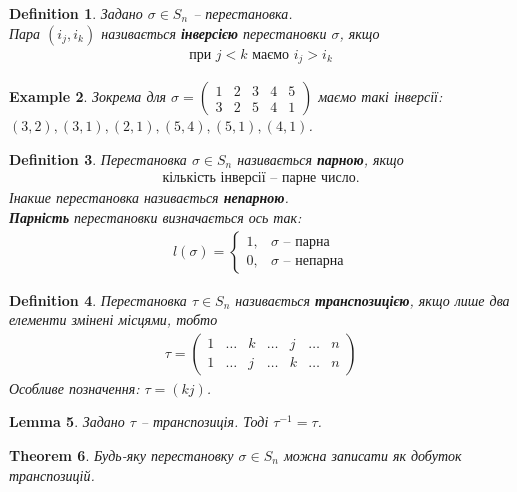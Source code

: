 \documentclass[a4paper, 10pt]{article}
\theoremstyle{theoremdd}
\newtheorem{theorem}{Theorem}[subsection]
\theoremstyle{theoremdd}
\newtheorem{definition}[theorem]{Definition}
\theoremstyle{theoremdd}
\theoremstyle{theoremdd}
\theoremstyle{theoremdd}
\newtheorem{example}[theorem]{Example}
\theoremstyle{theoremdd}
\theoremstyle{theoremdd}
\theoremstyle{theoremdd}
\theoremstyle{theoremdd}
\theoremstyle{theoremdd}
\theoremstyle{theoremdd}
\theoremstyle{theoremdd}
\theoremstyle{theoremdd}
\newtheorem{lemma}[theorem]{Lemma}
\theoremstyle{theoremdd}
\theoremstyle{theoremdd}
\begin{document}
\begin{definition}
Задано $\sigma \in S_n$ -- перестановка.\\
Пара $(i_j,i_k)$ називається \textbf{інверсією} перестановки $\sigma$, якщо 
\begin{align*}
\text{при } j < k \text{ маємо  } i_j > i_k
\end{align*}
\end{definition}

\begin{example}
Зокрема для $\sigma = \begin{pmatrix}
1 & 2 & 3 & 4 & 5\\
3 & 2 & 5 & 4 & 1
\end{pmatrix}$ маємо такі інверсії: $(3,2), (3,1), (2,1), (5,4), (5,1), (4,1)$.
\end{example}

\begin{definition}
Перестановка $\sigma \in S_n$ називається \textbf{парною}, якщо
\begin{align*}
\text{кількість інверсії -- парне число.}
\end{align*}
Інакше перестановка називається \textbf{непарною}.\\
\textbf{Парність} перестановки визначається ось так:
\begin{align*}
l(\sigma) = \begin{cases} 1, & \sigma \text{ -- парна}\\ 0, & \sigma \text{ -- непарна} \end{cases}
\end{align*}
\end{definition}

\begin{definition}
Перестановка $\tau \in S_n$ називається \textbf{транспозицією}, якщо лише два елементи змінені місцями, тобто
\begin{align*}
\tau = \begin{pmatrix}
1 & \dots & k & \dots & j & \dots & n \\
1 & \dots & j & \dots & k & \dots & n
\end{pmatrix}
\end{align*}
Особливе позначення: $\tau = (kj)$.
\end{definition}

\begin{lemma}
Задано $\tau$ -- транспозиція. Тоді $\tau^{-1} = \tau$.
\end{lemma}

\begin{theorem}
Будь-яку перестановку $\sigma \in S_n$ можна записати як добуток транспозицій.
\end{theorem}
\end{document}
